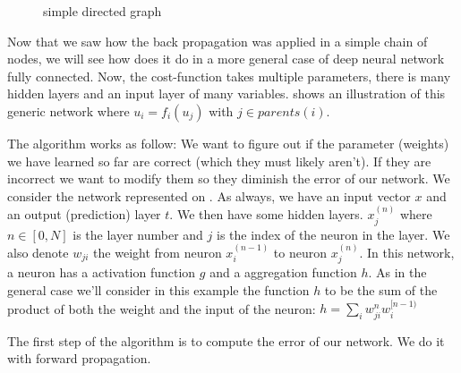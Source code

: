		\begin{figure}
			\centering
			\caption{simple directed graph}
			\label{fig:back_prop1}
		\end{figure}


	Now that we saw how the back propagation was applied in a simple chain of nodes, we will see how does it do in a more general case of deep neural network fully connected. Now, the cost-function takes multiple parameters, there is many hidden layers and an input layer of many variables.  shows an illustration of this generic network where $u_i = f_i(u_j)$ with $j \in parents(i)$.


	The algorithm works as follow:
	We want to figure out if the parameter (weights) we have learned so far are correct (which they must likely aren't). If they are incorrect we want to modify them so they diminish the error of our network. We consider the network represented on . As always, we have an input vector $x$ and an output (prediction) layer $t$. We then have some hidden layers. $x_j^{(n)}$ where $n \in [0,N]$ is the layer number and $j$ is the index of the neuron in the layer. We also denote $w_{ji}$ the weight from neuron $x_i^{(n-1)}$ to neuron $x_j^{(n)}$.
	In this network, a neuron has a activation function $g$ and a aggregation function $h$. As in the general case we'll consider in this example the function $h$ to be the sum of the product of both the weight and the input of the neuron: $h = \sum_i w_{ji}^n w_i^{[n-1)}$

	The first step of the algorithm is to compute the error of our network. We do it with forward propagation.

